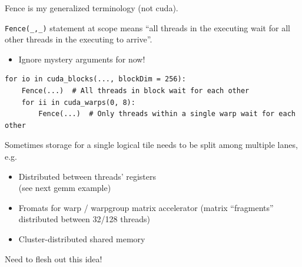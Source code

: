\begin{minipage}[t]{0.5\textwidth}\fixminipage
{}

Fence is my generalized terminology (not cuda).

\texttt{Fence(\_,\_)} statement at  scope means ``all threads in the executing  wait for all other threads in the executing  to arrive''.
\begin{itemize}
  \item Ignore mystery arguments for now!
\end{itemize}

\vspace{2mm}
{\tiny
\begin{verbatim}
for io in cuda_blocks(..., blockDim = 256):
    Fence(...)  # All threads in block wait for each other
    for ii in cuda_warps(0, 8):
        Fence(...)  # Only threads within a single warp wait for each other

\end{verbatim}
}
\vspace{6mm}


Sometimes storage for a single logical tile needs to be split among multiple lanes, e.g.
\begin{itemize}
  \item Distributed between threads' registers\\(see next gemm example)
  \item Fromats for warp / warpgroup matrix accelerator (matrix ``fragments'' distributed between 32/128 threads)
  \item Cluster-distributed shared memory
\end{itemize}

Need to flesh out this idea!
\end{minipage}
\newpage
{}

